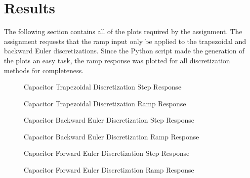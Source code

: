 \documentclass[10pt, oneside, letterpaper]{article}
\begin{document}
\section{Results}

The following section contains all of the plots required by the assignment. The assignment requests that the ramp input only be applied to the trapezoidal and backward Euler discretizations. Since the Python script made the generation of the plots an easy task, the ramp response was plotted for all discretization methods for completeness.

\begin{figure}[H]
  \begin{center}
    
  \end{center}
  \caption{Capacitor Trapezoidal Discretization Step Response}
  \label{trap_step}
\end{figure}

\begin{figure}[H]
  \begin{center}
    
  \end{center}
  \caption{Capacitor Trapezoidal Discretization Ramp Response}
  \label{trap_ramp}
\end{figure}

\begin{figure}[H]
  \begin{center}
    
  \end{center}
  \caption{Capacitor Backward Euler Discretization Step Response}
  \label{back_step}
\end{figure}

\begin{figure}[H]
  \begin{center}
    
  \end{center}
  \caption{Capacitor Backward Euler Discretization Ramp Response}
  \label{back_ramp}
\end{figure}

\begin{figure}[H]
  \begin{center}
    
  \end{center}
  \caption{Capacitor Forward Euler Discretization Step Response}
  \label{forward_step}
\end{figure}

\begin{figure}[H]
  \begin{center}
    
  \end{center}
  \caption{Capacitor Forward Euler Discretization Ramp Response}
  \label{forward_ramp}
\end{figure}
\end{document}

